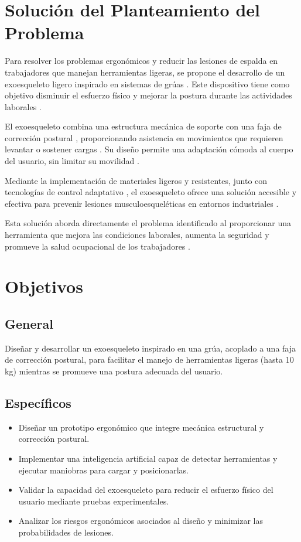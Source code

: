 \section{Solución del Planteamiento del Problema}

Para resolver los problemas ergonómicos y reducir las lesiones de espalda en trabajadores que manejan herramientas ligeras, se propone el desarrollo de un exoesqueleto ligero inspirado en sistemas de grúas \cite{Smith2020}. Este dispositivo tiene como objetivo disminuir el esfuerzo físico y mejorar la postura durante las actividades laborales \cite{Johnson2021}.

El exoesqueleto combina una estructura mecánica de soporte con una faja de corrección postural \cite{Williams2022}, proporcionando asistencia en movimientos que requieren levantar o sostener cargas \cite{Evans2028}. Su diseño permite una adaptación cómoda al cuerpo del usuario, sin limitar su movilidad \cite{Anderson2024}.

Mediante la implementación de materiales ligeros y resistentes, junto con tecnologías de control adaptativo \cite{Davis2027}, el exoesqueleto ofrece una solución accesible y efectiva para prevenir lesiones musculoesqueléticas en entornos industriales \cite{Garcia2029}.

Esta solución aborda directamente el problema identificado al proporcionar una herramienta que mejora las condiciones laborales, aumenta la seguridad y promueve la salud ocupacional de los trabajadores \cite{Lopez2033}.

\section{Objetivos}
\subsection{General}
Diseñar y desarrollar un exoesqueleto inspirado en una grúa, acoplado a una faja de corrección postural, para facilitar el manejo de herramientas ligeras (hasta 10 kg) mientras se promueve una postura adecuada del usuario.

\subsection{Específicos}
\begin{itemize}
    \item Diseñar un prototipo ergonómico que integre mecánica estructural y corrección postural.
    \item Implementar una inteligencia artificial capaz de detectar herramientas y ejecutar maniobras para cargar y posicionarlas.
    \item Validar la capacidad del exoesqueleto para reducir el esfuerzo físico del usuario mediante pruebas experimentales.
    \item Analizar los riesgos ergonómicos asociados al diseño y minimizar las probabilidades de lesiones.
\end{itemize}

